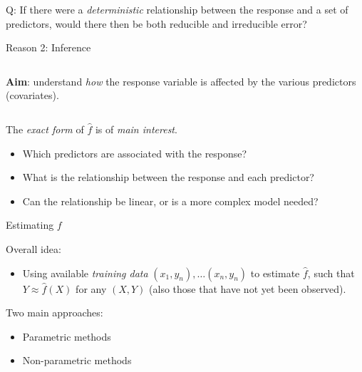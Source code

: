 \documentclass[ignorenonframetext,]{beamer}
\providecommand{\tightlist}{%
  \setlength{\itemsep}{0pt}\setlength{\parskip}{0pt}}
\begin{document}
\begin{frame}

\begin{block}{Q: If there were a \emph{deterministic} relationship
between the response and a set of predictors, would there then be both
reducible and irreducible error?}

\end{block}

\end{frame}

\begin{frame}

\begin{block}{Reason 2: Inference}

\(~\)

\textbf{Aim}: understand \emph{how} the response variable is affected by
the various predictors (covariates).

\(~\)

The \emph{exact form} of \(\hat{f}\) is of \emph{main interest}.

\vspace{2mm}

\begin{itemize}
\tightlist
\item
  Which predictors are associated with the response?
\item
  What is the relationship between the response and each predictor?
\item
  Can the relationship be linear, or is a more complex model needed?
\end{itemize}

\end{block}

\end{frame}

\begin{frame}{Estimating \(f\)}
\protect\hypertarget{estimating-f}{}

Overall idea:

\begin{itemize}
\tightlist
\item
  Using available \emph{training data} \((x_1,y_n),\ldots (x_n,y_n)\) to
  estimate \(\hat{f}\), such that \(Y\approx \hat{f}(X)\) for any
  \((X,Y)\) (also those that have not yet been observed).
\end{itemize}

Two main approaches:

\begin{itemize}
\tightlist
\item
  Parametric methods
\item
  Non-parametric methods
\end{itemize}

\end{frame}
\end{document}
